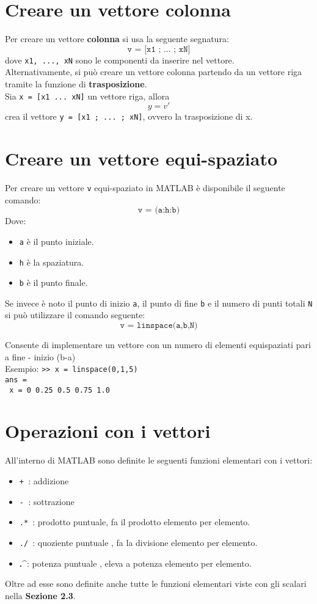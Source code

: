 \section{Creare un vettore colonna}
Per creare un vettore \textbf{colonna} si usa la seguente segnatura:
$$ \texttt{v = [x1 ; ... ; xN]} $$
dove \texttt{x1, ..., xN} sono le componenti da inserire nel vettore. \\
Alternativamente, si può creare un vettore colonna partendo da un vettore riga tramite la funzione di 
\textbf{trasposizione}. \\
Sia \texttt{x = [x1 ... xN]} un vettore riga, allora 
$$ y = v' $$
crea il vettore \texttt{y = [x1 ; ... ; xN]}, ovvero la trasposizione di x.

\section{Creare un vettore equi-spaziato}
Per creare un vettore \texttt{v} equi-spaziato in MATLAB è disponibile il seguente comando:
$$ \texttt{v = (a:h:b)} $$
Dove:
\begin{itemize}
	\item 	\texttt{a} è il punto iniziale.
	\item	\texttt{h} è la spaziatura.
	\item	\texttt{b} è il punto finale.
\end{itemize}

Se invece è noto il punto di inizio \texttt{a}, il punto di fine \texttt{b} e il numero di punti totali \texttt{N} si 
può utilizzare il comando seguente:
$$ \texttt{v = linspace(a,b,N)} $$

Consente di implementare un vettore con un numero di elementi equispaziati pari a fine - inizio (b-a)\\
Esempio:
\texttt{>> x = linspace(0,1,5)} \\
\texttt{ans = } \\
\texttt{\hspace{0.5cm} x = 0 \hspace{0.5cm} 0.25 \hspace{0.5cm} 0.5 \hspace{0.5cm} 0.75 \hspace{0.5cm} 1.0} \break

\section{Operazioni con i vettori}
All'interno di MATLAB sono definite le seguenti funzioni elementari con i vettori:
\begin{itemize}

	\item	\texttt{+ }: addizione
	\item	\texttt{- }: sottrazione
	\item	\texttt{.* }: prodotto puntuale, fa il prodotto elemento per elemento.
	\item	\texttt{./ }: quoziente puntuale , fa la divisione elemento per elemento.
	\item	\textbf{.\^}: potenza puntuale , eleva a potenza elemento per elemento.

\end{itemize}

Oltre ad esse sono definite anche tutte le funzioni elementari viste con gli scalari nella \textbf{Sezione 2.3}.
